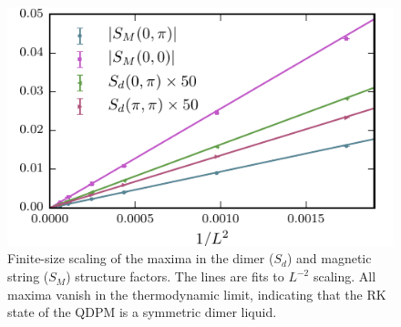 \documentclass[twocolumn,prb,aps,floatfix,superscriptaddress]{revtex4-1}
\begin{document}
\begin{figure}[h!]
    \centering
    \includegraphics[width=1.0\columnwidth]{peak_scaling.pdf}
    \caption{Finite-size scaling of the maxima in the dimer ($S_d$) and magnetic string ($S_M$) structure factors. The lines are fits to $L^{-2}$ scaling. All maxima vanish in the thermodynamic limit, indicating that the RK state of the QDPM is a symmetric dimer liquid. }
    \label{fig:bragg_scaling}
\end{figure}
\end{document}
